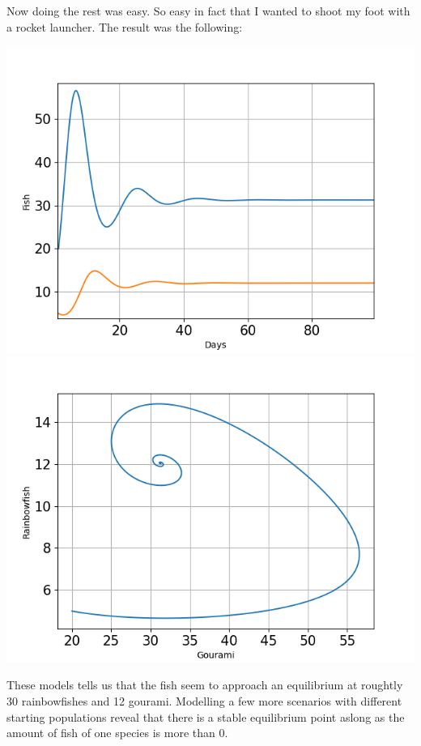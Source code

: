 \begin{flushleft}
    Now doing the rest was easy. So easy in fact that I wanted to shoot my foot
    with a rocket launcher. The result was the following:

\end{flushleft}
\begin{center}
    \includegraphics[scale=0.5]{../figures/Figure_2.png}
    \includegraphics[scale=0.5]{../figures/Figure_3.png}

\end{center}

\begin{flushleft}
    These models tells us that the fish seem to approach an equilibrium at roughtly
    30 rainbowfishes and 12 gourami. Modelling a few more scenarios with different
    starting populations reveal that there is a stable equilibrium point aslong as
    the amount of fish of one species is more than 0.

\end{flushleft}

